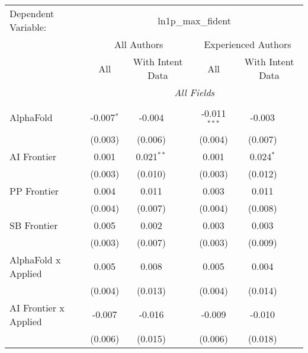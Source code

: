 \begingroup
\centering
\begin{tabular}{lcccccc}
   \tabularnewline \midrule \midrule
   Dependent Variable: & \multicolumn{6}{c}{ln1p\_max\_fident}\\
 & \multicolumn{3}{c}{All Authors} & \multicolumn{3}{c}{Experienced Authors} \\
\cmidrule(lr){2-4} \cmidrule(lr){5-7}
 & \multicolumn{1}{c}{All} & \multicolumn{2}{c}{With Intent Data} & \multicolumn{1}{c}{All} & \multicolumn{2}{c}{With Intent Data} \\
\cmidrule(lr){2-2} \cmidrule(lr){3-4} \cmidrule(lr){5-5} \cmidrule(lr){6-7}
 & \multicolumn{6}{c}{\textit{All Fields}} \\ \\
   AlphaFold                      & -0.007$^{*}$ & -0.004       &                & -0.011$^{***}$ & -0.003      &   \\   
                                  & (0.003)      & (0.006)      &                & (0.004)        & (0.007)     &   \\   
   AI Frontier                    & 0.001        & 0.021$^{**}$ &                & 0.001          & 0.024$^{*}$ &   \\   
                                  & (0.003)      & (0.010)      &                & (0.003)        & (0.012)     &   \\   
   PP Frontier                    & 0.004        & 0.011        &                & 0.003          & 0.011       &   \\   
                                  & (0.004)      & (0.007)      &                & (0.004)        & (0.008)     &   \\   
   SB Frontier                    & 0.005        & 0.002        &                & 0.003          & 0.003       &   \\   
                                  & (0.003)      & (0.007)      &                & (0.003)        & (0.009)     &   \\   
   AlphaFold x Applied            & 0.005        & 0.008        &                & 0.005          & 0.004       &   \\   
                                  & (0.004)      & (0.013)      &                & (0.004)        & (0.014)     &   \\   
   AI Frontier x Applied          & -0.007       & -0.016       &                & -0.009         & -0.010      &   \\   
                                  & (0.006)      & (0.015)      &                & (0.006)        & (0.018)     &   \\   

\end{tabular}

